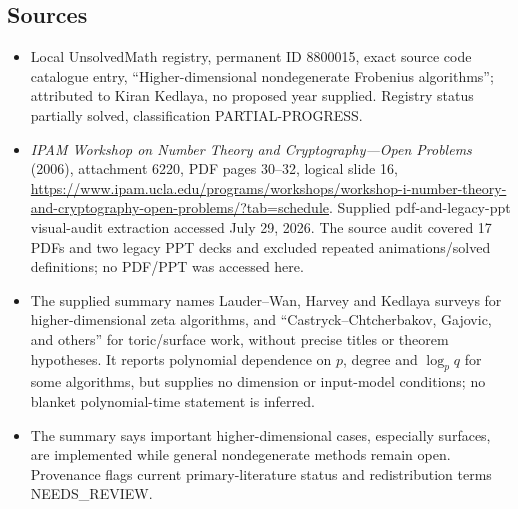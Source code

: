 \documentclass[11pt]{article}
\begin{document}
\subsection{Sources}
\begin{itemize}
\item Local UnsolvedMath registry, permanent ID 8800015, exact source code catalogue entry, ``Higher-dimensional nondegenerate Frobenius algorithms''; attributed to Kiran Kedlaya, no proposed year supplied. Registry status partially solved, classification PARTIAL-PROGRESS.
\item \emph{IPAM Workshop on Number Theory and Cryptography---Open Problems} (2006), attachment 6220, PDF pages 30--32, logical slide 16, \url{https://www.ipam.ucla.edu/programs/workshops/workshop-i-number-theory-and-cryptography-open-problems/?tab=schedule}. Supplied pdf-and-legacy-ppt visual-audit extraction accessed July 29, 2026. The source audit covered 17 PDFs and two legacy PPT decks and excluded repeated animations/solved definitions; no PDF/PPT was accessed here.
\item The supplied summary names Lauder--Wan, Harvey and Kedlaya surveys for higher-dimensional zeta algorithms, and ``Castryck--Chtcherbakov, Gajovic, and others'' for toric/surface work, without precise titles or theorem hypotheses. It reports polynomial dependence on $p$, degree and $\log_pq$ for some algorithms, but supplies no dimension or input-model conditions; no blanket polynomial-time statement is inferred.
\item The summary says important higher-dimensional cases, especially surfaces, are implemented while general nondegenerate methods remain open. Provenance flags current primary-literature status and redistribution terms NEEDS\_REVIEW.
\end{itemize}
\end{document}
